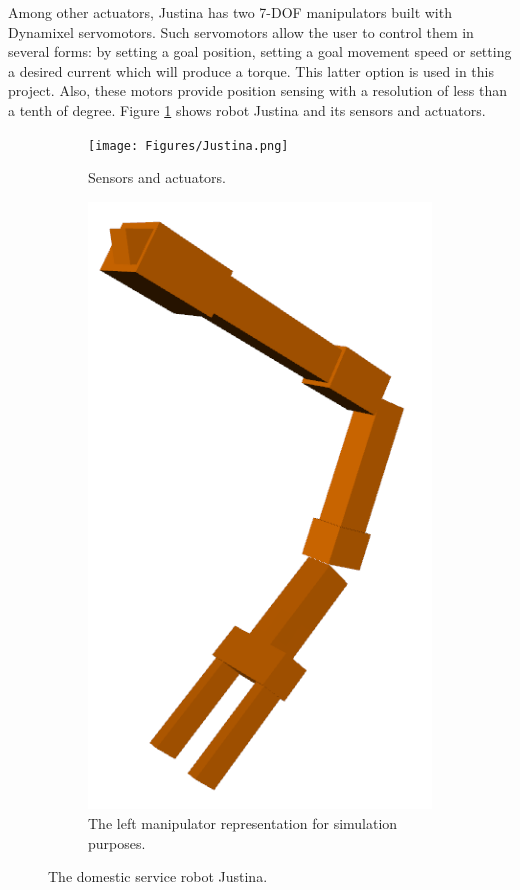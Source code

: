 \documentclass[a4paper, 10pt]{article}
\begin{document}
Among other actuators, Justina has two 7-DOF manipulators built with Dynamixel servomotors. Such servomotors allow the user to control them in several forms: by setting a goal position, setting a goal movement speed or setting a desired current which will produce a torque. This latter option is used in this project. Also, these motors provide position sensing with a resolution of less than a tenth of degree. Figure \ref{fig:Justina} shows robot Justina and its sensors and actuators. 
\begin{figure}
  \centering
  \begin{subfigure}[b]{0.35\textwidth}
    \centering
    \texttt{[image: Figures/Justina.png]}
    \caption{Sensors and actuators.}
    \label{fig:Justina}
  \end{subfigure}
  \hfill
  \begin{subfigure}[b]{0.3\textwidth}
    \centering
    \includegraphics[width=\textwidth]{Figures/left_arm.png}
    \caption{The left manipulator representation for simulation purposes.}
    \label{fig:left_arm}
  \end{subfigure}
  \caption{The domestic service robot Justina.}
\end{figure}
\end{document}
